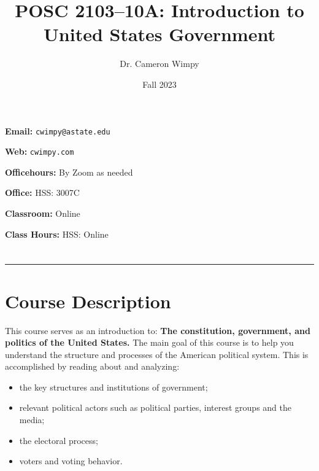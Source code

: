 \documentclass[11pt]{article}
\title{\vspace{0.3cm}\textcolor{customred}{\bfseries\sffamily POSC 2103--10A: Introduction to United States Government}}
\author{Dr. Cameron Wimpy}
\date{Fall 2023}
\begin{document}
\maketitle

\begin{minipage}[t]{0.5\textwidth}
   \hspace{0.2em}\textbf{Email:} \texttt{cwimpy@astate.edu} \\
\end{minipage}%
\begin{minipage}[t]{0.5\textwidth}
  \hfill {} \textbf{Web:} \texttt{cwimpy.com}
\end{minipage}

\begin{minipage}[t]{0.5\textwidth}
   \hspace{0.2em}\textbf{Officehours:} By Zoom as needed \\
\end{minipage}%
\begin{minipage}[t]{0.5\textwidth}
  \hfill {} \textbf{Office:} HSS: 3007C
\end{minipage}

\begin{minipage}[t]{0.5\textwidth}
   \hspace{0.2em}\textbf{Classroom:} Online \\
\end{minipage}%
\begin{minipage}[t]{0.5\textwidth}
  \hfill {} \textbf{Class Hours:} HSS: Online
\end{minipage}

\section*{}
\rule{\linewidth}{0.4pt}

\section*{\textcolor{customred}{\bfseries Course Description}}
This course serves as an introduction to: \textbf{The constitution, government, and politics of the United States.} The main goal of this course is to help you understand the structure and processes of the American political system. This is accomplished by reading about and analyzing:

\begin{itemize}
  \item the key structures and institutions of government;
  \item relevant political actors such as political parties, interest groups and the media;
  \item the electoral process;
  \item voters and voting behavior.
\end{itemize}
\end{document}
